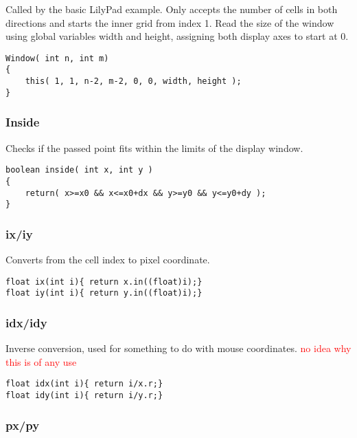 \documentclass[notitlepage]{article}
\begin{document}
Called by the basic LilyPad example. Only accepts the number of cells in both directions
and starts the inner grid from index 1. Read the size of the window using
global variables width and height, assigning both display axes to start at 0.

\begin{lstlisting}[style=myCpp]
Window( int n, int m)
{
	this( 1, 1, n-2, m-2, 0, 0, width, height );
}
\end{lstlisting}

\subsubsection{Inside}

Checks if the passed point fits within the limits of the display window.

\begin{lstlisting}[style=myCpp]
boolean inside( int x, int y )
{
	return( x>=x0 && x<=x0+dx && y>=y0 && y<=y0+dy );
}
\end{lstlisting}

\subsubsection{ix/iy}

Converts from the cell index to pixel coordinate.

\begin{lstlisting}[style=myCpp]
float ix(int i){ return x.in((float)i);}
float iy(int i){ return y.in((float)i);}
\end{lstlisting}

\subsubsection{idx/idy}

Inverse conversion, used for something to do with mouse coordinates.
\textcolor{red}{no idea why this is of any use}

\begin{lstlisting}[style=myCpp]
float idx(int i){ return i/x.r;}
float idy(int i){ return i/y.r;}
\end{lstlisting}

\subsubsection{px/py}
\end{document}
